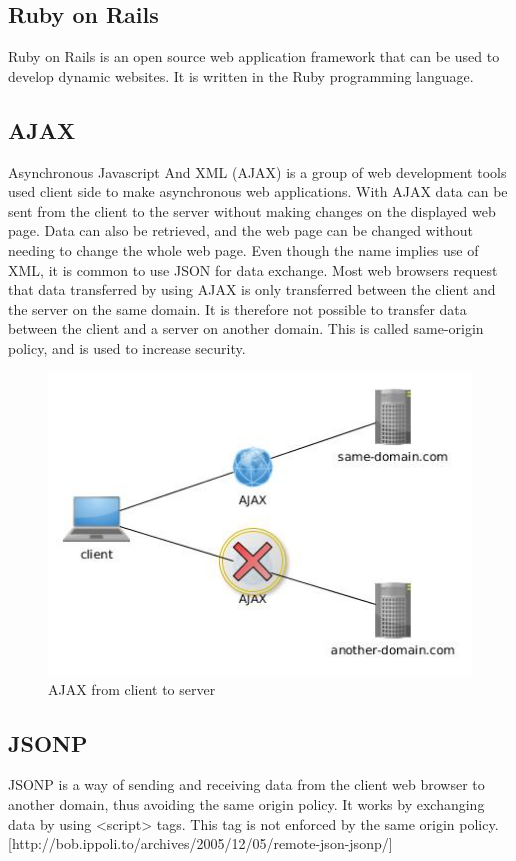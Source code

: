 \documentclass[10pt,a4paper]{article}
\begin{document}
\subsection{Ruby on Rails}
Ruby on Rails is an open source web application framework that can be used to develop dynamic websites. It is written in the Ruby programming language. 

\subsection{AJAX}
Asynchronous Javascript And XML (AJAX) is a group of web development tools used client side to make asynchronous web applications. With AJAX data can be sent from the client to the server without making changes on the displayed web page. Data can also be retrieved, and the web page can be changed without needing to change the whole web page. Even though the name implies use of XML, it is common to use JSON for data exchange. Most web browsers request that data transferred by using AJAX is only transferred between the client and the server on the same domain. It is therefore not possible to transfer data between the client and a server on another domain. This is called same-origin policy, and is used to increase security.

\begin{figure}
\centering
\includegraphics[width=0.8\linewidth]{../ajax/ajax}
\caption{AJAX from client to server}
\label{AJAX}
\end{figure}


\subsection{JSONP}
JSONP is a way of sending and receiving data from the client web browser to another domain, thus avoiding the same origin policy. It works by exchanging data by using <script> tags. This tag is not enforced by the same origin policy. [http://bob.ippoli.to/archives/2005/12/05/remote-json-jsonp/]
\end{document}
